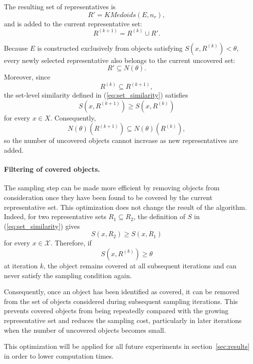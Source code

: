\documentclass{ieeeaccess}
\newcommand{\toblack}{\color{black}}
\newcommand{\tored}{\color{red}}
\newcommand{\pk}[1]{{\tored [{\bfseries Pierre}: {\itshape #1}] \toblack}}
\newcommand{\representativeamount}{m}
\newcommand{\threshold}{\theta}
\newcommand{\kmedoidsalg}{KMedoids\xspace}
\begin{document}
The resulting set of representatives is
\[
R' = \kmedoidsalg(E,n_r),
\]
and is added to the current representative set:
\[
R^{(k+1)} = R^{(k)} \cup R'.
\]

Because $E$ is constructed exclusively from objects satisfying
$S(x,R^{(k)}) < \threshold$, every newly selected representative also
belongs to the current uncovered set:
\[
R' \subseteq N(\threshold).
\]
Moreover, since
\[
R^{(k)} \subseteq R^{(k+1)},
\]
the set-level similarity defined in (\ref{eq:set_similarity}) satisfies
\[
S(x,R^{(k+1)}) \geq S(x,R^{(k)})
\]
for every $x \in X$. Consequently,
\[
N(\threshold)(R^{(k+1)})
\subseteq
N(\threshold)(R^{(k)}),
\]
so the number of uncovered objects cannot increase as new representatives are added.





\paragraph*{Filtering of covered objects.}

The sampling step can be made more efficient by removing objects from consideration once they have been found to be covered by the current representative set. This optimization does not change the result of the algorithm. Indeed, for two representative sets $R_1\subseteq R_2$, the definition of $S$ in
(\ref{eq:set_similarity}) gives
\[
S(x,R_2)\geq S(x,R_1)
\]
for every $x\in\mathcal{X}$. Therefore, if
\[
S(x,R^{(k)})\geq\threshold
\]
at iteration $k$, the object remains covered at all subsequent iterations and can never satisfy the sampling condition again.

Consequently, once an object has been identified as covered, it can be removed from the set of objects considered during subsequent sampling iterations. This prevents covered objects from being repeatedly compared with the growing representative set and reduces the sampling cost, particularly in later iterations when the number of uncovered objects becomes small.

This optimization will be applied for all future experiments in section~\ref{sec:results} in order to lower computation times.
\end{document}
